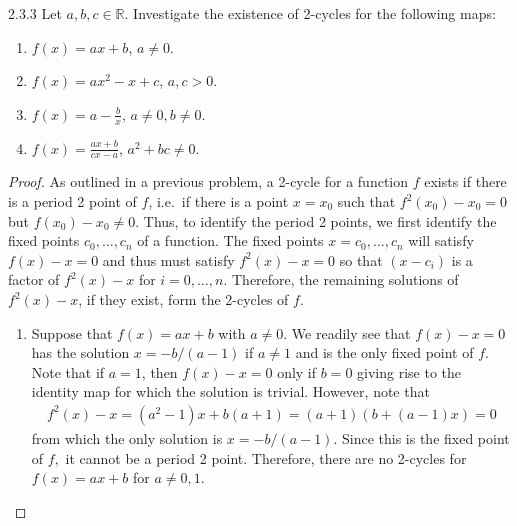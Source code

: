 \begin{problem}{2.3.3}
  Let $a,b,c \in \mathbb{R}$. Investigate the existence of 2-cycles for the following
  maps:
  \begin{enumerate}
    \item $f(x) = ax + b$, $a\neq 0$.
    \item $f(x) = ax^2 - x + c$, $a, c > 0$.
    \item $f(x) = a - \frac{b}{x}$, $a\neq 0, b \neq 0$.
    \item $f(x) = \frac{ax + b}{cx-a}$, $a^2 + bc \neq 0$.
  \end{enumerate}
\end{problem}

\begin{proof}
  As outlined in a previous problem, a 2-cycle for a function $f$ exists if there is a period
  2 point of $f$, i.e.\ if there is a point $x=x_0$ such that $f^2(x_0)-x_0 = 0$ but $f(x_0) - x_0 \neq 0$.
  Thus, to identify the period 2 points, we first identify the fixed points $c_0, \dots, c_n$ of a function.
  The fixed points $x=c_0, \dots, c_n$ will satisfy $f(x) - x = 0$ and thus must satisfy $f^2(x) - x = 0$
  so that $(x-c_i)$ is a factor of $f^2(x) - x$ for $i=0,\dots,n$. Therefore, the remaining solutions of
  $f^2(x) - x$, if they exist, form the 2-cycles of $f$.

  \begin{enumerate}
    \item Suppose that $f(x) = ax + b$ with $a\neq 0$. We readily see that $f(x) - x = 0$
      has the solution $x = -b/(a-1)$ if $a\neq 1$ and is the only fixed point of $f$. Note that if $a=1$,
      then $f(x) -x = 0$ only if $b=0$ giving rise to the identity map for which the solution is trivial.
      However, note that
      \begin{align*}
        f^2(x) -x = (a^2 -1)x +b(a+1) = (a+1)(b + (a-1)x) = 0
      \end{align*}
      from which the only solution is $x = - b/(a-1)$. Since this is the fixed point of $f,$ it cannot be a period
      2 point. Therefore, there are no 2-cycles for $f(x) = ax +b$ for $a\neq 0, 1$.


\end{enumerate}
\end{proof}
